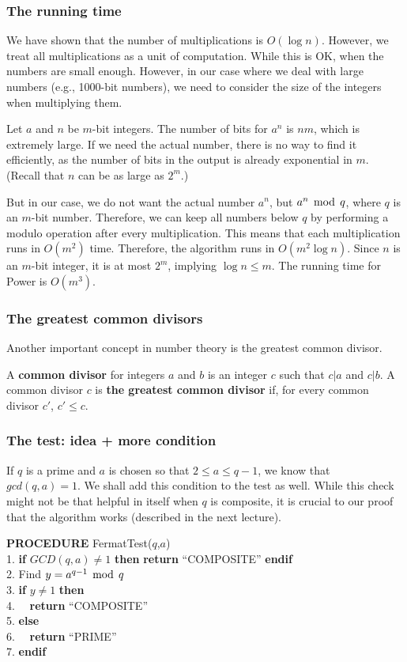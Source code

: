 \begin{frame}\frametitle{The running time}
  We have shown that the number of multiplications is $O(\log n)$.
  However, we treat all multiplications as a unit of computation.
  While this is OK, when the numbers are small enough.  However, in
  our case where we deal with large numbers (e.g., 1000-bit numbers),
  we need to consider the size of the integers when multiplying
  them.

  \vspace{0.08in}
  Let $a$ and $n$ be $m$-bit integers. The number of bits for $a^n$ is
  $nm$, which is extremely large.  If we need the actual number, there
  is no way to find it efficiently, as the number of bits in the
  output is already exponential in $m$.  (Recall that $n$ can be as
  large as $2^m$.)

  \vspace{0.08in}
  But in our case, we do not want the actual number $a^n$, but
  $a^n\,\bmod\, q$, where $q$ is an $m$-bit number.  Therefore, we can keep
  all numbers below $q$ by performing a modulo operation after every
  multiplication.  This means that each multiplication runs in
  $O(m^2)$ time.  Therefore, the algorithm runs in $O(m^2\log n)$.
  Since $n$ is an $m$-bit integer, it is at most $2^m$, implying $\log
  n\leq m$.  The running time for Power is $O(m^3)$.
\end{frame}

\begin{frame}\frametitle{The greatest common divisors}
  Another important concept in number theory is the greatest common
  divisor.

  A {\bf common divisor} for integers $a$ and $b$ is an integer $c$
  such that $c|a$ and $c|b$.  A common divisor $c$ is {\bf the
    greatest common divisor} if, for every common divisor $c'$,
  $c'\leq c$.
\end{frame}

\begin{frame}\frametitle{The test: idea + more condition}
  If $q$ is a prime and $a$ is chosen so that $2\leq a\leq q-1$, we
  know that $gcd(q,a)=1$.  We shall add this condition to the test as
  well.  While this check might not be that helpful in itself when $q$
  is composite, it is crucial to our proof that the algorithm works
  (described in the next lecture).

  \begin{tcolorbox}
    {\bf PROCEDURE} FermatTest($q$,$a$)\\
    1. {\bf if} $GCD(q,a)\neq 1$ {\bf then} {\bf return} ``COMPOSITE'' {\bf endif}\\
    2. Find $y = a^{q-1}\,\bmod\, q$\\
    3. {\bf if} $y\neq 1$ {\bf then}\\
    4. \ \ {\bf return} ``COMPOSITE''\\
    5. {\bf else}\\
    6. \ \ {\bf return} ``PRIME''\\
    7. {\bf endif}
  \end{tcolorbox}
\end{frame}

